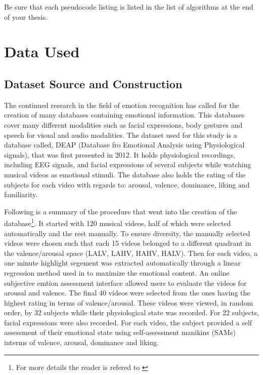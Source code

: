 \documentclass[12pt, a4paper, fleqn]{memoir}%
\begin{document}
Be sure that each pseudocode listing is listed in the list of algorithms at the end of your thesis.


\chapter{Data Used}
\label{chap:dataset}

\section{Dataset Source and Construction}
\label{sec:DatasetSource}
The continued research in the field of emotion recognition has called for the creation of many databases containing emotional information. This databases cover many different modalities such as facial expressions, body gestures and speech for visual and audio modalities. The dataset used for this study is a database called, DEAP (Database fro Emotional Analysis using Physiological signals), that was first presented in 2012. It holds physiological recordings, including EEG signals, and facial expressions of several subjects while watching musical videos as emotional stimuli. The database also holds the rating of the subjects for each video with regards to: arousal, valence, dominance, liking and familiarity\cite{koelstra2012deap}.

Following is a summary of the procedure that went into the creation of the database\footnote{For more details the reader is refered to \cite{koelstra2012deap}}. It started with 120 musical videos, half of which were selected automatically and the rest manually. To ensure diversity, the manually selected videos were chosen such that each 15 videos belonged to a different quadrant in the valence/arousal space (LALV, LAHV, HAHV, HALV). Then for each video, a one minute highlight segement was extracted automatically through a linear regression method used in \cite{soleymani2008bayesian} to maximize the emotional content. An online subjective emtion assessment interface allowed users to evaluate the videos for arousal and valence. The final 40 videos were selected from the ones having the highest rating in terms of valence/arousal. These videos were viewed, in random order, by 32 subjects while their physiological state was recorded. For 22 subjects, facial expressions were also recorded. For each video, the subject provided a self assessment of their emotional state using self-assessment manikins (SAMs) interms of valence, arousal, dominance and liking\cite{koelstra2012deap}.
\end{document}
